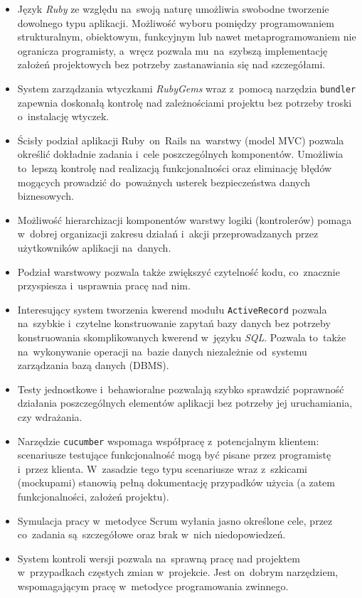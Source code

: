 \begin{itemize}
  \item Język \textit{Ruby} ze względu na~swoją naturę umożliwia swobodne tworzenie dowolnego typu aplikacji. Możliwość wyboru pomiędzy programowaniem strukturalnym, obiektowym, funkcyjnym lub nawet metaprogramowaniem nie ogranicza programisty, a~wręcz pozwala mu~na~szybszą implementację założeń projektowych bez potrzeby zastanawiania się nad szczegółami.
  \item System zarządzania wtyczkami \textit{RubyGems} wraz z~pomocą narzędzia \texttt{bundler} zapewnia doskonałą kontrolę nad zależnościami projektu bez potrzeby troski o~instalację wtyczek.
  \item Ścisły podział aplikacji Ruby~on~Rails na~warstwy (model MVC) pozwala określić dokładnie zadania i~cele poszczególnych komponentów. Umożliwia to~lepszą kontrolę nad realizacją funkcjonalności oraz eliminację błędów mogących prowadzić do~poważnych usterek bezpieczeństwa danych biznesowych.
  \item Możliwość hierarchizacji komponentów warstwy logiki (kontrolerów) pomaga w~dobrej organizacji zakresu działań i~akcji przeprowadzanych przez użytkowników aplikacji na~danych.
  \item Podział warstwowy pozwala także zwiększyć czytelność kodu, co~znacznie przyspiesza i~usprawnia pracę nad nim.
  \item Interesujący system tworzenia kwerend modułu \texttt{ActiveRecord} pozwala na~szybkie i~czytelne konstruowanie zapytań bazy danych bez potrzeby konstruowania skomplikowanych kwerend w~języku \textit{SQL}. Pozwala to~także na~wykonywanie operacji na~bazie danych niezależnie od~systemu zarządzania bazą danych (DBMS).
  \item Testy jednostkowe i~behawioralne pozwalają szybko sprawdzić poprawność działania poszczególnych elementów aplikacji bez potrzeby jej uruchamiania, czy wdrażania.
  \item Narzędzie \texttt{cucumber} wspomaga współpracę z~potencjalnym klientem: scenariusze testujące funkcjonalność mogą być pisane przez programistę i~przez klienta. W~zasadzie tego typu scenariusze wraz z~szkicami (mockupami) stanowią pełną dokumentację przypadków użycia (a zatem funkcjonalności, założeń projektu).
  \item Symulacja pracy w~metodyce Scrum wyłania jasno określone cele, przez co~zadania są~szczegółowe oraz brak w~nich niedopowiedzeń.
  \item System kontroli wersji pozwala na~sprawną pracę nad projektem w~przypadkach częstych zmian w~projekcie. Jest on~dobrym narzędziem, wspomagającym pracę w~metodyce programowania zwinnego.
\end{itemize}
